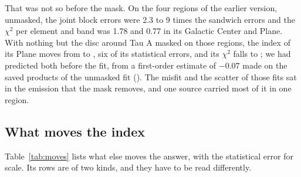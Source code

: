 That was not so before the mask. On the four regions of the earlier version, unmasked, the
joint block errors were 2.3 to 9 times the sandwich errors and the $\chi^2$ per element and band was
1.78 and 0.77 in its Galactic Center and Plane. With nothing but the disc around Tau A masked on
those regions, the index of its Plane moves from  to , six of its
statistical errors, and its $\chi^2$ falls to ; we had predicted both before the fit, from a
first-order estimate of $-0.07$ made on the saved products of the unmasked fit (). The misfit and
the scatter of those fits sat in the emission that the mask removes, and one source carried most of
it in one region.

\subsection{What moves the index}
\label{sec:moves}

\begin{table}
\centering
\caption{Changes of the profile index of Table~\ref{tab:same} under analysis choices that have nothing
to do with the estimator (). ``Index from $\ell \le L$'': K band and 353 GHz keep all
their modes, which with the prior on the CMB fixes the amplitudes, and Ka, Q and V inform the index
through their harmonic coefficients at multipoles 2 to $L$ only. The row ``K and Ka only, both fits
from $\ell \le 20$'' is the K, Ka fit minus the four-band fit when both are read from multipoles up to
20. The flat-prior row repeats Table~\ref{tab:same}. In brackets, for the arms that use less of the
same data under the same model: the change in units of the standard deviation that the model
predicts for it, $(\sigma_{\rm arm}^2 - \sigma_{\rm base}^2)^{1/2}$, and for the white prior in units
of the first-order value of Eq.~(\ref{eq:mismatch}). The other arms change the model, and their change has no sampling error; the last four change the
mask (in the Plane the first, second and fourth of them change the data by 9, 12 and 6 percent). The statistical error of the baseline is given for scale.}
\label{tab:moves}
\small

\end{table}

Table~\ref{tab:moves} lists what else moves the answer, with the statistical error for scale. Its
rows are of two kinds, and they have to be read differently.

